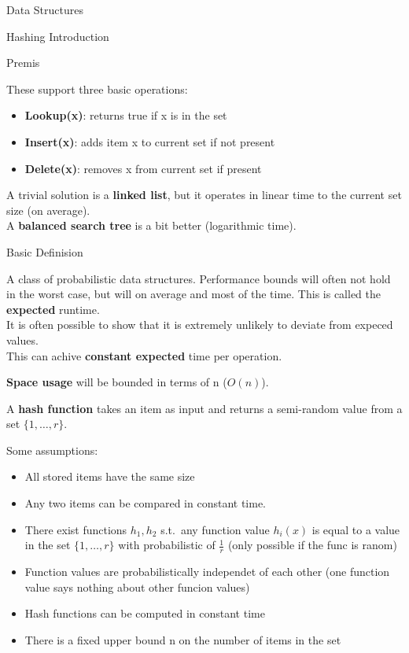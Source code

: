 \documentclass[12pt, letterpaper]{article}
\begin{document}
\begin{section}{Data Structures}

  \begin{subsection}{Hashing Introduction}

    \begin{subsubsection}{Premis}

      These support three basic operations:
      \begin{itemize}
        \item \textbf{Lookup(x)}: returns true if x is in the set
        \item \textbf{Insert(x)}: adds item x to current set if not present
        \item \textbf{Delete(x)}: removes x from current set if present
      \end{itemize}

      A trivial solution is a \textbf{linked list}, but it operates in linear
      time to the current set size (on average). \\
      A \textbf{balanced search tree} is a bit better (logarithmic time).

    \end{subsubsection}

    \begin{subsubsection}{Basic Definision}

      A class of probabilistic data structures. Performance bounds will often
      not hold in the worst case, but will on average and most of the time.
      This is called the \textbf{expected} runtime. \\
      It is often possible to show that it is extremely unlikely to deviate
      from expeced values. \\
      This can achive \textbf{constant expected} time per operation.

      \textbf{Space usage} will be bounded in terms of n (\(O(n)\)).

      A \textbf{hash function} takes an item as input and returns a
      semi-random value from a set \(\{ 1, \dots , r \}\).

      Some assumptions:
      \begin{itemize}
        \item All stored items have the same size
        \item Any two items can be  compared in constant time.
        \item There exist functions \(h_{1}, h_{2}\) s.t.\ any function value
              \(h_{i}(x)\) is equal to a value in the set \(\{ 1, \dots , r
              \}\) with probabilistic of \(\frac{1}{r}\) (only possible if the
              func is ranom)
        \item Function values are probabilistically independet of each other
              (one function value says nothing about other funcion values)
        \item Hash functions can be computed in constant time
        \item There is a fixed upper bound n on the number of items in the set
      \end{itemize}


\end{subsubsection}
\end{subsection}
\end{section}
\end{document}
